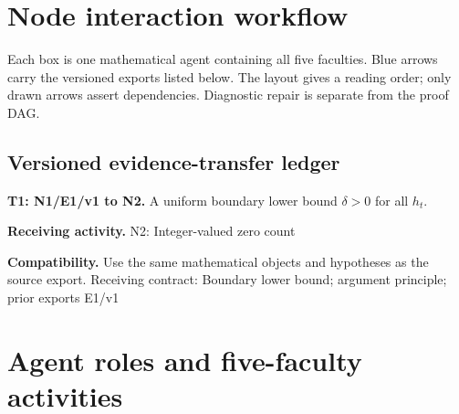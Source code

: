 \documentclass[preprint,12pt,aps,pra,showkeys,amsmath,amssymb,superscriptaddress,floatfix]{revtex4-2}
\theoremstyle{definition}
\theoremstyle{remark}
\newcommand{\field}[2]{\par\smallskip\noindent\textbf{#1.} #2\par}
\begin{document}
\clearpage\section{Node interaction workflow}

\begin{center}\end{center}

Each box is one mathematical agent containing all five faculties. Blue
arrows carry the versioned exports listed below. The layout gives a
reading order; only drawn arrows assert dependencies. Diagnostic repair
is separate from the proof DAG.

\subsection{Versioned evidence-transfer ledger}

\begingroup\small\linespread{1.05}\selectfont

\field{T1: N1/E1/v1 to N2}{A uniform boundary lower bound \(\delta >0\) for all \(h_t\).}

\field{Receiving activity}{N2: Integer-valued zero count}

\field{Compatibility}{Use the same mathematical objects and hypotheses as the source export.
Receiving contract: Boundary lower bound; argument principle; prior
exports E1/v1}

\endgroup

\clearpage\section{Agent roles and five-faculty activities}\begingroup\small\linespread{1.05}\selectfont{}
\end{document}
